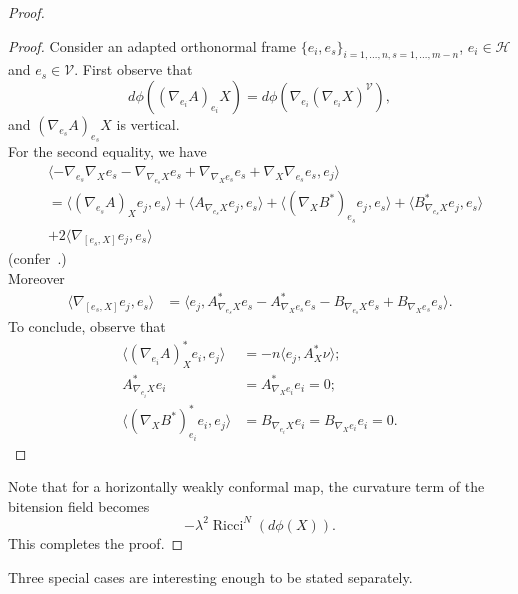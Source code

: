 \documentclass[12pt]{amsart}
\theoremstyle{plain}
\theoremstyle{definition}
\begin{document}
\begin{proof}
\begin{proof}
Consider an adapted orthonormal frame $\{e_{i}, e_{s}\}_{i=1,\dots,n,
s=1,\dots,m-n}$, $e_{i} \in {\mathcal{H}}$ and $e_{s} \in {\mathcal{V}}$. First observe that
$$ d\phi((\nabla_{e_{i}}A )_{e_{i}} X) =  d\phi(\nabla_{e_{i}} (\nabla_{e_{i}} X)^{\mathcal{V}} ),$$
and $(\nabla_{e_{s}} A)_{e_{s}} X$ is vertical.\\
For the second equality, we have
\begin{align*}
&\langle -\nabla_{e_{s}}\nabla_{X} e_{s} - \nabla_{\nabla_{e_{s}}X}e_{s}
+ \nabla_{\nabla_{X}e_{s}}e_{s} + \nabla_{X}\nabla_{e_{s}}e_{s}, e_{j}\rangle  \\
&= \langle (\nabla_{e_{s}}A)_{X} e_{j}, e_{s}\rangle  + \langle A_{\nabla_{e_{s}} X}
e_{j}, e_{s}\rangle + \langle (\nabla_{X}B^{*})_{e_{s}} e_{j}, e_{s}\rangle + \langle
B^{*}_{\nabla_{e_{s}}X} e_{j}, e_{s}\rangle \\
&+ 2 \langle \nabla_{[e_{s},X]} e_{j} ,e_{s} \rangle
\end{align*}
(confer~\cite[Th. 11.2.1 iii)]{B-W}.)\\
Moreover
\begin{align*}
\langle \nabla_{[e_{s},X]} e_{j} , e_{s} \rangle &= \langle e_{j} , A^{*}_{\nabla_{e_{s}}X} e_{s} -A^{*}_{\nabla_{X}e_{s}} e_{s} -
B_{\nabla_{e_{s}}X} e_{s} + B_{\nabla_{X}e_{s}} e_{s} \rangle .
\end{align*}
To conclude, observe that
\begin{align*}
 \langle (\nabla_{e_{i}}A)^{*}_{X} e_{i}, e_{j}\rangle &= - n\langle  e_{j} , A^{*}_{X}\nu \rangle ;\\
 A^{*}_{\nabla_{e_{i}} X} e_{i} &=  A^{*}_{\nabla_{X}e_{i}} e_{i} = 0 ;\\
\langle (\nabla_{X}B^{*})^{*}_{e_{i}} e_{i}, e_{j}\rangle &= 
 B_{\nabla_{e_{i}}X}e_{i} = B_{\nabla_{X} e_{i}}  e_{i}  = 0.
\end{align*}
\end{proof}
Note that for a horizontally weakly conformal map, the curvature term of the bitension field becomes
$$-\lambda^2 \operatorname{Ricci}^{N}(d\phi(X)).$$
This completes the proof.
\end{proof}

Three special cases are interesting enough to be stated separately.
\end{document}
